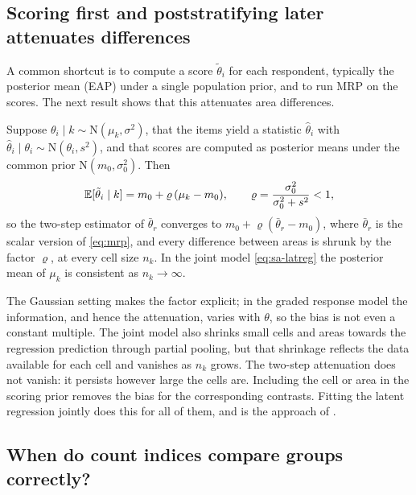 \subsection{Scoring first and poststratifying later attenuates differences}\label{sec:sa-eap}

A common shortcut is to compute a score $\tilde\theta_i$ for each respondent, typically the posterior mean (EAP) under a single population prior, and to run MRP on the scores. The next result shows that this attenuates area differences.

\begin{proposition}\label{prop:eap}
Suppose $\theta_i\mid k\sim\mathrm N(\mu_k,\sigma^2)$, that the items yield a statistic $\hat\theta_i$ with $\hat\theta_i\mid\theta_i\sim\mathrm N(\theta_i,s^2)$, and that scores are computed as posterior means under the common prior $\mathrm N(m_0,\sigma_0^2)$. Then
\begin{equation}\label{eq:sa-eap}
  \mathbb{E}[\tilde\theta_i\mid k]=m_0+\varrho\,(\mu_k-m_0),\qquad \varrho=\frac{\sigma_0^2}{\sigma_0^2+s^2}<1,
\end{equation}
so the two-step estimator of $\bar\theta_r$ converges to $m_0+\varrho(\bar\theta_r-m_0)$, where $\bar\theta_r$ is the scalar version of \eqref{eq:mrp}, and every difference between areas is shrunk by the factor $\varrho$, at every cell size $n_k$. In the joint model \eqref{eq:sa-latreg} the posterior mean of $\mu_k$ is consistent as $n_k\to\infty$.
\end{proposition}

The Gaussian setting makes the factor explicit; in the graded response model the information, and hence the attenuation, varies with $\theta$, so the bias is not even a constant multiple. The joint model also shrinks small cells and areas towards the regression prediction through partial pooling, but that shrinkage reflects the data available for each cell and vanishes as $n_k$ grows. The two-step attenuation does not vanish: it persists however large the cells are. Including the cell or area in the scoring prior removes the bias for the corresponding contrasts. Fitting the latent regression jointly does this for all of them, and is the approach of \citet{mislevy1991}.

\subsection{When do count indices compare groups correctly?}\label{sec:sa-index}

